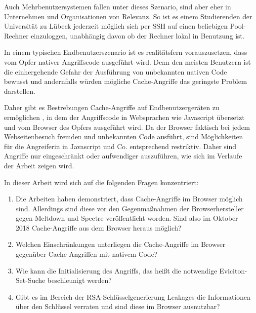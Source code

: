 Auch Mehrbenutzersystemen fallen unter dieses Szenario, sind aber eher in Unternehmen und Organisationen von Relevanz.
So ist es einem Studierenden der Universität zu Lübeck jederzeit möglich sich per SSH auf einen beliebigen Pool-Rechner einzuloggen, unabhängig davon ob der Rechner lokal in Benutzung ist.

In einem typischen Endbenutzerszenario ist es realitätsfern vorauszusetzen, dass vom Opfer nativer Angriffscode ausgeführt wird.
Denn den meisten Benutzern ist die einhergehende Gefahr der Ausführung von unbekannten nativen Code bewusst und andernfalls würden mögliche Cache-Angriffe das geringste Problem darstellen.

Daher gibt es Bestrebungen Cache-Angriffe auf Endbenutzergeräten zu ermöglichen \cite{TheSpyInTheSandbox,DriveByPaper,ASLROnTheLine}, in dem der Angriffscode in Websprachen wie Javascript übersetzt und vom Browser des Opfers ausgeführt wird.
Da der Browser faktisch bei jedem Webseitenbesuch fremden und unbekannten Code ausführt, sind Möglichkeiten für die Angreiferin in Javascript und Co. entsprechend restriktiv.
Daher sind Angriffe nur eingeschränkt oder aufwendiger auszuführen, wie sich im Verlaufe der Arbeit zeigen wird. 

In dieser Arbeit  wird sich auf die folgenden Fragen konzentriert:

\begin{enumerate}
\item Die Arbeiten \cite{TheSpyInTheSandbox,DriveByPaper,ASLROnTheLine} haben demonstriert, dass Cache-Angriffe im Browser möglich sind. 
Allerdings sind diese vor den Gegenmaßnahmen der Browserhersteller gegen Meltdown und Spectre veröffentlicht worden.
Sind also im Oktober 2018 Cache-Angriffe aus dem Browser heraus möglich?

\item Welchen Einschränkungen unterliegen die Cache-Angriffe im Browser gegenüber Cache-Angriffen mit nativem Code?

\item Wie kann die Initialisierung des Angriffs, das heißt die notwendige Eviciton-Set-Suche beschleunigt werden?

\item Gibt es im Bereich der RSA-Schlüsselgenerierung Leakages die Informationen über den Schlüssel verraten und sind diese im Browser ausnutzbar?
\end{enumerate}


